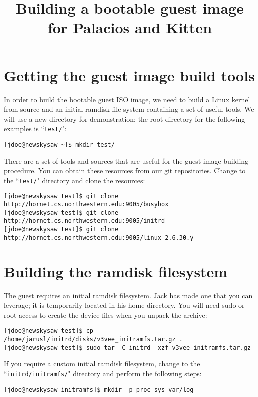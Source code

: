 \documentclass{article}[11pt]
\title{Building a bootable guest image for Palacios and Kitten}
\begin{document}
\maketitle

\section{Getting the guest image build tools}

In order to build the bootable guest ISO image, we need to build a Linux kernel
 from source and an initial ramdisk file system containing a set of useful
tools. We will use a new directory for demonstration; the root directory for the
following examples is ``\verb+test/+":

\begin{verbatim}
[jdoe@newskysaw ~]$ mkdir test/
\end{verbatim}

\noindent
There are a set of tools and sources that are useful for the guest image
building procedure. You can obtain these resources from our git repositories.
Change to the ``\verb+test/+" directory and clone the resources:

\begin{verbatim}
[jdoe@newskysaw test]$ git clone http://hornet.cs.northwestern.edu:9005/busybox
[jdoe@newskysaw test]$ git clone http://hornet.cs.northwestern.edu:9005/initrd
[jdoe@newskysaw test]$ git clone http://hornet.cs.northwestern.edu:9005/linux-2.6.30.y
\end{verbatim}

\section{Building the ramdisk filesystem}
The guest requires an initial ramdisk filesystem. Jack has made one that you can
leverage; it is temporarily located in his home directory.  You will need sudo
or root access to create the device files when you unpack the archive:

\begin{verbatim}
[jdoe@newskysaw test]$ cp /home/jarusl/initrd/disks/v3vee_initramfs.tar.gz .
[jdoe@newskysaw test]$ sudo tar -C initrd -xzf v3vee_initramfs.tar.gz
\end{verbatim}

\noindent
If you require a custom initial ramdisk filesystem, change to the
``\verb|initrd/initramfs/|" directory and perform the following steps:

\begin{verbatim}
[jdoe@newskysaw initramfs]$ mkdir -p proc sys var/log
\end{verbatim}
\end{document}
